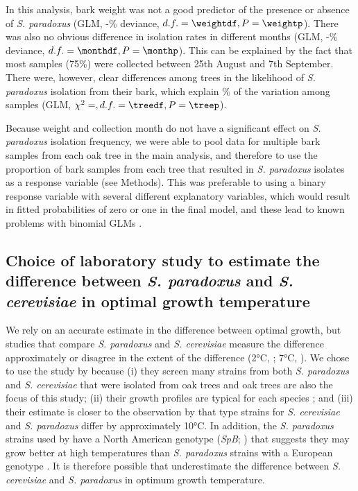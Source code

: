 \documentclass[12pt]{article}
\begin{document}
In this analysis, bark weight was not a good predictor of the presence or absence of \textit{S. paradoxus} (GLM, -\weightpcentdev\% deviance, $d.f.=\weightdf, P=\weightp$). There was also no obvious difference in isolation rates in different months (GLM, -\monthpcentdev\% deviance, $d.f.=\monthdf, P=\monthp$). This can be explained by the fact that most samples (75\%) were collected between 25th August and 7th September. There were, however, clear differences among trees in the likelihood of \textit{S. paradoxus} isolation from their bark, which explain \treepcentdev\% of the variation among samples (GLM, $\chi^2=, d.f.=\treedf, P=\treep$). 

Because weight and collection month do not have a significant effect on \textit{S. paradoxus} isolation frequency, we were able to pool data for multiple bark samples from each oak tree in the main analysis, and therefore to use the proportion of bark samples from each tree that resulted in \textit{S. paradoxus} isolates as a response variable (see Methods). This was preferable to using a binary response variable with several different explanatory variables, which would result in fitted probabilities of zero or one in the final model, and these lead to known problems with binomial GLMs \citep{venables_modern_2002}. 

\subsection*{Choice of laboratory study to estimate the difference between \textit{S. paradoxus} and \textit{S. cerevisiae} in optimal growth temperature}

We rely on an accurate estimate in the difference between optimal growth, but studies that compare \textit{S. paradoxus} and \textit{S. cerevisiae} measure the difference approximately \citep{liti_population_2009,leducq_local_2014} or disagree in the extent of the difference (2\si{\degreeCelsius}, \citealp{salvado_temperature_2011}; 7\si{\degreeCelsius}, \citealp{sweeney_sympatric_2004}). We chose to use the study by \citet{sweeney_sympatric_2004} because (i) they screen many strains from both \textit{S. paradoxus} and \textit{S. cerevisiae} that were isolated from oak trees and oak trees are also the focus of this study; (ii) their growth profiles are typical for each species \citep{liti_population_2009}; and (iii) their estimate is closer to the observation by \citet{leducq_local_2014} that type strains for \textit{S. cerevisiae} and \textit{S. paradoxus} differ by approximately 10\si{\degreeCelsius}. In addition, the \textit{S. paradoxus} strains used by \citet{sweeney_sympatric_2004} have a North American genotype (\textit{SpB}; \citealp{kuehne_allopatric_2007}) that suggests they may grow better at high temperatures than \textit{S. paradoxus} strains with a European genotype \citep{leducq_local_2014,leducq_speciation_2015}. It is therefore possible that \citet{sweeney_sympatric_2004} underestimate the difference between \textit{S. cerevisiae} and \textit{S. paradoxus} in optimum growth temperature.
\end{document}
